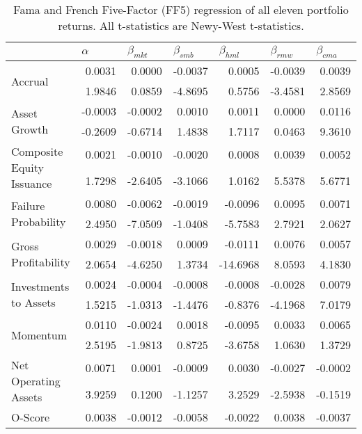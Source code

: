 \documentclass[a4paper]{article}                 %
\begin{document}
\begin{table}[h]
    \scriptsize
    \caption{\newline Fama and French Five-Factor (FF5) regression of all eleven portfolio returns. All t-statistics are Newy-West t-statistics.}
    \label{tab:Table 4}
    \begin{tabular}{@{}lrrrrrr@{}}
    \toprule
     & \multicolumn{1}{l}{$\alpha$} & \multicolumn{1}{l}{$\beta_{mkt}$} & \multicolumn{1}{l}{$\beta_{smb}$} & \multicolumn{1}{l}{$\beta_{hml}$} & \multicolumn{1}{l}{$\beta_{rmw}$} & \multicolumn{1}{l}{$\beta_{cma}$} \\ \midrule
    \multirow{2}{*}{Accrual} & 0.0031 & 0.0000 & -0.0037 & 0.0005 & -0.0039 & 0.0039 \\
     & 1.9846 & 0.0859 & -4.8695 & 0.5756 & -3.4581 & 2.8569 \\
    \multirow{2}{*}{Asset Growth} & -0.0003 & -0.0002 & 0.0010 & 0.0011 & 0.0000 & 0.0116 \\
     & -0.2609 & -0.6714 & 1.4838 & 1.7117 & 0.0463 & 9.3610 \\
    \multirow{2}{*}{Composite Equity Issuance} & 0.0021 & -0.0010 & -0.0020 & 0.0008 & 0.0039 & 0.0052 \\
     & 1.7298 & -2.6405 & -3.1066 & 1.0162 & 5.5378 & 5.6771 \\
    \multirow{2}{*}{Failure Probability} & 0.0080 & -0.0062 & -0.0019 & -0.0096 & 0.0095 & 0.0071 \\
     & 2.4950 & -7.0509 & -1.0408 & -5.7583 & 2.7921 & 2.0627 \\
    \multirow{2}{*}{Gross Profitability} & 0.0029 & -0.0018 & 0.0009 & -0.0111 & 0.0076 & 0.0057 \\
     & 2.0654 & -4.6250 & 1.3734 & -14.6968 & 8.0593 & 4.1830 \\
    \multirow{2}{*}{Investments to Assets} & 0.0024 & -0.0004 & -0.0008 & -0.0008 & -0.0028 & 0.0079 \\
     & 1.5215 & -1.0313 & -1.4476 & -0.8376 & -4.1968 & 7.0179 \\
    \multirow{2}{*}{Momentum} & 0.0110 & -0.0024 & 0.0018 & -0.0095 & 0.0033 & 0.0065 \\
     & 2.5195 & -1.9813 & 0.8725 & -3.6758 & 1.0630 & 1.3729 \\
    \multirow{2}{*}{Net Operating Assets} & 0.0071 & 0.0001 & -0.0009 & 0.0030 & -0.0027 & -0.0002 \\
     & 3.9259 & 0.1200 & -1.1257 & 3.2529 & -2.5938 & -0.1519 \\
    \multirow{2}{*}{O-Score} & 0.0038 & -0.0012 & -0.0058 & -0.0022 & 0.0038 & -0.0037 \\

\end{tabular}
\end{table}
\end{document}
